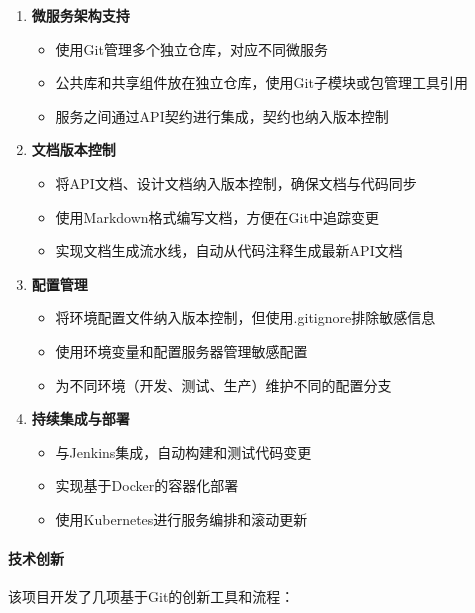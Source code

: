\begin{enumerate}
\def\labelenumi{\arabic{enumi}.}
\tightlist
\item
  \textbf{微服务架构支持}

  \begin{itemize}
  \tightlist
  \item
    使用Git管理多个独立仓库，对应不同微服务
  \item
    公共库和共享组件放在独立仓库，使用Git子模块或包管理工具引用
  \item
    服务之间通过API契约进行集成，契约也纳入版本控制
  \end{itemize}
\item
  \textbf{文档版本控制}

  \begin{itemize}
  \tightlist
  \item
    将API文档、设计文档纳入版本控制，确保文档与代码同步
  \item
    使用Markdown格式编写文档，方便在Git中追踪变更
  \item
    实现文档生成流水线，自动从代码注释生成最新API文档
  \end{itemize}
\item
  \textbf{配置管理}

  \begin{itemize}
  \tightlist
  \item
    将环境配置文件纳入版本控制，但使用.gitignore排除敏感信息
  \item
    使用环境变量和配置服务器管理敏感配置
  \item
    为不同环境（开发、测试、生产）维护不同的配置分支
  \end{itemize}
\item
  \textbf{持续集成与部署}

  \begin{itemize}
  \tightlist
  \item
    与Jenkins集成，自动构建和测试代码变更
  \item
    实现基于Docker的容器化部署
  \item
    使用Kubernetes进行服务编排和滚动更新
  \end{itemize}
\end{enumerate}

\paragraph{技术创新}\label{ux6280ux672fux521bux65b0}

该项目开发了几项基于Git的创新工具和流程：

